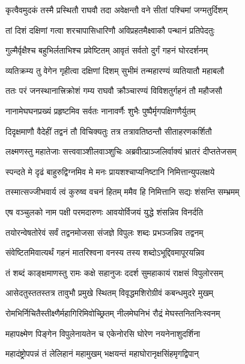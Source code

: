 \twolineshloka
{कृत्वैवमुदकं तस्मै प्रस्थितौ राघवौ तदा}
{अवेक्षन्तौ वने सीतां पश्चिमां जग्मतुर्दिशम्} %

\twolineshloka
{तां दिशं दक्षिणां गत्वा शरचापासिधारिणौ}
{अविप्रहतमैक्ष्वाकौ पन्थानं प्रतिपेदतुः} %

\twolineshloka
{गुल्मैर्वृक्षैश्च बहुभिर्लताभिश्च प्रवेष्टितम्}
{आवृतं सर्वतो दुर्गं गहनं घोरदर्शनम्} %

\twolineshloka
{व्यतिक्रम्य तु वेगेन गृहीत्वा दक्षिणां दिशम्}
{सुभीमं तन्महारण्यं व्यतियातौ महाबलौ} %

\twolineshloka
{ततः परं जनस्थानात्त्रिक्रोशं गम्य राघवौ}
{क्रौञ्चारण्यं विविशतुर्गहनं तौ महौजसौ} %

\twolineshloka
{नानामेघघनप्रख्यं प्रहृष्टमिव सर्वतः}
{नानावर्णैः शुभैः पुष्पैर्मृगपक्षिगणैर्युतम्} %

\twolineshloka
{दिदृक्षमाणौ वैदेहीं तद्वनं तौ विचिक्यतुः}
{तत्र तत्रावतिष्ठन्तौ सीताहरणकर्शितौ} %

\twolineshloka
{लक्ष्मणस्तु महातेजाः सत्त्ववाञ्शीलवाञ्शुचिः}
{अब्रवीत्प्राञ्जलिर्वाक्यं भ्रातरं दीप्ततेजसम्} %

\twolineshloka
{स्पन्दते मे दृढं बाहुरुद्विग्नमिव मे मनः}
{प्रायशश्चाप्यनिष्टानि निमित्तान्युपलक्षये} %

\twolineshloka
{तस्मात्सज्जीभवार्य त्वं कुरुष्व वचनं हितम्}
{ममैव हि निमित्तानि सद्यः शंसन्ति सम्भ्रमम्} %

\twolineshloka
{एष वञ्चुलको नाम पक्षी परमदारुणः}
{आवयोर्विजयं युद्धे शंसन्निव विनर्दति} %

\twolineshloka
{तयोरन्वेषतोरेवं सर्वं तद्वनमोजसा}
{संजज्ञे विपुलः शब्दः प्रभञ्जन्निव तद्वनम्} %

\twolineshloka
{संवेष्टितमिवात्यर्थं गहनं मातरिश्वना}
{वनस्य तस्य शब्दोऽभूद्दिवमापूरयन्निव} %

\twolineshloka
{तं शब्दं काङ्क्षमाणस्तु रामः कक्षे सहानुजः}
{ददर्श सुमहाकायं राक्षसं विपुलोरसम्} %

\twolineshloka
{आसेदतुस्ततस्तत्र तावुभौ प्रमुखे स्थितम्}
{विवृद्धमशिरोग्रीवं कबन्धमुदरे मुखम्} %

\twolineshloka
{रोमभिर्निचितैस्तीक्ष्णैर्महागिरिमिवोच्छ्रितम्}
{नीलमेघनिभं रौद्रं मेघस्तनितनिःस्वनम्} %

\twolineshloka
{महापक्ष्मेण पिङ्गेन विपुलेनायतेन च}
{एकेनोरसि घोरेण नयनेनाशुदर्शिना} %

\twolineshloka
{महादंष्ट्रोपपन्नं तं लेलिहानं महामुखम्}
{भक्षयन्तं महाघोरानृक्षसिंहमृगद्विपान्} %

